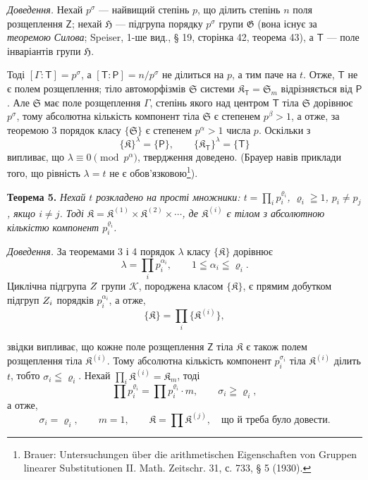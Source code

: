 \documentclass[11pt]{article}
\newcommand{\srcfn}[2]{\footnote{#2}}
\begin{document}
\emph{Доведення.} Нехай \(p^\sigma\) --- найвищий степінь \(p\), що ділить степінь \(n\) поля розщеплення \(\mathsf{Z}\); нехай \(\mathfrak H\) --- підгрупа порядку \(p^\sigma\) групи \(\mathfrak G\) (вона існує за \emph{теоремою Силова}; Speiser, 1-ше вид., § 19, сторінка 42, теорема 43), а \(\mathsf{T}\) --- поле інваріантів групи \(\mathfrak H\).

Тоді \([\Gamma:\mathsf{T}]=p^\sigma\), а \([\mathsf{T}:\mathsf P]=n/p^\sigma\) не ділиться на \(p\), а тим паче на \(t\). Отже, \(\mathsf{T}\) не є полем розщеплення; тіло автоморфізмів \(\mathfrak S\) системи \(\mathfrak K_{\mathsf{T}}=\mathfrak S_m\) відрізняється від \(\mathsf P\). Але \(\mathfrak S\) має поле розщеплення \(\Gamma\), степінь якого над центром \(\mathsf{T}\) тіла \(\mathfrak S\) дорівнює \(p^\sigma\), тому абсолютна кількість компонент тіла \(\mathfrak S\) є степенем \(p^\beta>1\), а отже, за теоремою 3 порядок класу \(\{\mathfrak S\}\) є степенем \(p^\alpha>1\) числа \(p\). Оскільки з
\[
\{\mathfrak K\}^{\lambda}=\{\mathsf P\},
\qquad
\{\mathfrak K_{\mathsf{T}}\}^{\lambda}=\{\mathsf{T}\}
\]
випливає, що \(\lambda\equiv0\pmod {p^\alpha}\), твердження доведено. (Брауер навів приклади того, що рівність \(\lambda=t\) не є обов'язковою\srcfn{1}{Brauer: Untersuchungen über die arithmetischen Eigenschaften von Gruppen linearer Substitutionen II. Math. Zeitschr. 31, с. 733, § 5 (1930).}).

\textbf{Теорема 5.} \emph{Нехай \(t\) розкладено на прості множники: \(t=\prod_i p_i^{\varrho_i}\), \(\varrho_i\geqq1\), \(p_i\ne p_j\), якщо \(i\ne j\). Тоді \(\mathfrak K=\mathfrak K^{(1)}\times\mathfrak K^{(2)}\times\cdots\), де \(\mathfrak K^{(i)}\) є тілом з абсолютною кількістю компонент \(p_i^{\varrho_i}\).}

\emph{Доведення.} За теоремами 3 і 4 порядок \(\lambda\) класу \(\{\mathfrak K\}\) дорівнює
\[
\lambda=\prod_i p_i^{\alpha_i},\qquad 1\leqq\alpha_i\leqq\varrho_i.
\]
Циклічна підгрупа \(\mathscr \mathsf{Z}\) групи \(\mathscr K\), породжена класом \(\{\mathfrak K\}\), є прямим добутком підгруп \(\mathscr \mathsf{Z}_i\) порядків \(p_i^{\alpha_i}\), а отже,
\[
\{\mathfrak K\}=\prod_i\{\mathfrak K^{(i)}\},
\]

звідки випливає, що кожне поле розщеплення \(\mathsf{Z}\) тіла \(\mathfrak K\) є також полем розщеплення тіла \(\mathfrak K^{(i)}\). Тому абсолютна кількість компонент \(p_i^{\sigma_i}\) тіла \(\mathfrak K^{(i)}\) ділить \(t\), тобто \(\sigma_i\leqq\varrho_i\). Нехай \(\prod_i \mathfrak K^{(i)}=\mathfrak K_m\), тоді
\[
\prod p_i^{\varrho_i}=\prod p_i^{\varrho_i}\cdot m,
\qquad
\sigma_i\geqq\varrho_i,
\]
а отже,
\[
\sigma_i=\varrho_i,\qquad m=1,\qquad
\mathfrak K=\prod \mathfrak K^{(j)},
\quad\text{що й треба було довести.}
\]
\end{document}

